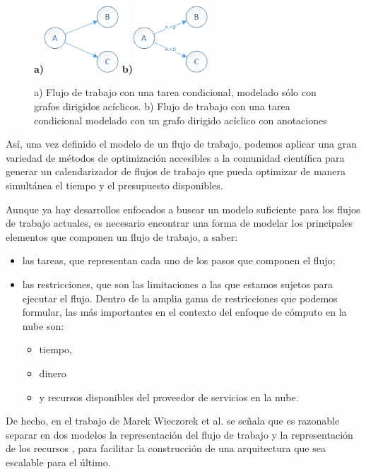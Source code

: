 \documentclass[letterpaper, 12pt]{report}
\begin{document}
\begin{figure}
    \begin{center}
        \textbf{ a)}\includegraphics[width=0.25\textwidth]{imagenes/ConditionalTask1}
        \textbf{ b)}\includegraphics[width=0.25\textwidth]{imagenes/ConditionalTask2}

    \end{center}
    \caption{a) Flujo de trabajo con una tarea condicional, modelado sólo con grafos dirigidos acíclicos.  b) Flujo de trabajo con una tarea condicional modelado con un grafo dirigido acíclico con anotaciones }
    \label{fig:conditionalTask}
\end{figure}


Así, una vez definido el modelo de un flujo de trabajo, podemos aplicar una gran variedad de métodos de optimización accesibles a la comunidad científica para generar un calendarizador de flujos de trabajo que pueda optimizar de manera simultánea el tiempo y el presupuesto disponibles.

Aunque ya hay desarrollos enfocados a buscar un modelo suficiente para los flujos de trabajo actuales, es necesario encontrar una forma de modelar los principales elementos que componen un flujo de trabajo, a saber: 
\begin{itemize}
\item las tareas, que representan cada uno de los pasos que componen el flujo;
\item las restricciones, que son las limitaciones a las que estamos sujetos para ejecutar el flujo. Dentro de la amplia gama de restricciones que podemos formular, las más importantes en el contexto del enfoque de cómputo en la nube son:
  \begin{itemize}
  \item tiempo,
  \item dinero 
  \item y recursos disponibles del proveedor de servicios en la nube.
  \end{itemize}
\end{itemize}
De hecho, en el trabajo de Marek Wieczorek et al. se señala que es razonable separar en dos modelos la representación del flujo de trabajo y la representación de los recursos \cite{wieczorek2009towards}, para facilitar la construcción de una arquitectura que sea escalable para el último.
\end{document}
